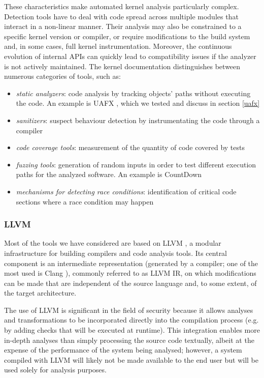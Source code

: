 These characteristics make automated kernel analysis particularly complex. Detection tools have to deal with code spread across multiple modules that interact in a non-linear manner. Their analysis may also be constrained to a specific kernel version or compiler, or require modifications to the build system and, in some cases, full kernel instrumentation. Moreover, the continuous evolution of internal APIs can quickly lead to compatibility issues if the analyzer is not actively maintained. The kernel documentation distinguishes between numerous categories of tools, such as:
\begin{itemize}
    \item \textit{static analyzers}: code analysis by tracking objects' paths without executing the code. An example is UAFX \cite{bib:uafx}, which we tested and discuss in section \ref{uafx}
    \item \textit{sanitizers}: suspect behaviour detection by instrumentating the code through a compiler
    \item \textit{code coverage tools}: measurement of the quantity of code covered by tests
    \item \textit{fuzzing tools}: generation of random inputs in order to test different execution paths for the analyzed software. An example is CountDown
    \item \textit{mechanisms for detecting race conditions}: identification of critical code sections where a race condition may happen
\end{itemize}

\subsubsection{LLVM}
Most of the tools we have considered are based on LLVM \cite{bib:llvm}, a modular infrastructure for building compilers and code analysis tools. Its central component is an intermediate representation (generated by a compiler; one of the most used is Clang \cite{bib:clang}), commonly referred to as LLVM IR, on which modifications can be made that are independent of the source language and, to some extent, of the target architecture. 

The use of LLVM is significant in the field of security because it allows analyses and transformations to be incorporated directly into the compilation process (e.g. by adding checks that will be executed at runtime). This integration enables more in-depth analyses than simply processing the source code textually, albeit at the expense of the performance of the system being analysed; however, a system compiled with LLVM will likely not be made available to the end user but will be used solely for analysis purposes.

